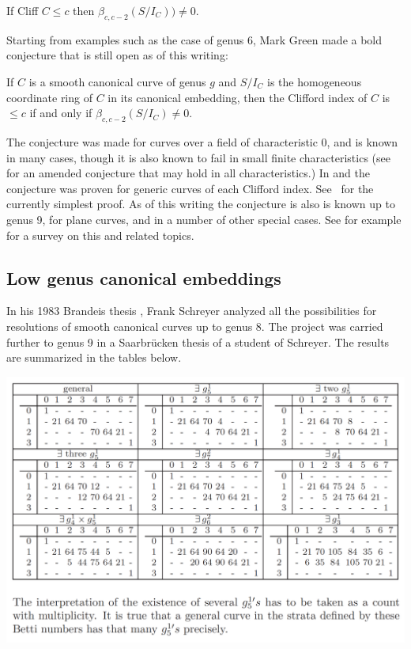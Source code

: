 \begin{corollary}
 If Cliff $C \leq c$ then $\beta_{c,c-2}(S/I_C)) \neq 0.$
\end{corollary}
 

Starting from examples such as the case of genus 6, Mark Green made a bold conjecture that is still open as of this writing:

\begin{conjecture}
If $C$ is a smooth canonical curve of genus $g$ and $S/I_C$ is the homogeneous coordinate ring of $C$ in its canonical embedding,
then the Clifford index of $C$ is $\leq c$ if and only if $\beta_{c,c-2}(S/I_C) \neq 0$. 
\end{conjecture}

The conjecture was made for curves over a field of characteristic 0, and is known in many cases, though it is also known to fail in small finite characteristics (see~\cite{Bopp-Schreyer} for an amended conjecture that may hold in all characteristics.)
In \cite{MR1941089} and \cite{MR2157134} the conjecture was proven for generic curves of each Clifford index.  See~\cite{MR4022070} for the currently simplest
proof. As of this writing the conjecture is also is known up to genus 9,  for plane curves, and in a number of other special cases.
See for example \cite{Farkas-progress-on-syzygies} for a survey on this and related topics.

\subsection{Low genus canonical embeddings} 
In his 1983 Brandeis thesis \cite{Schreyer-canonical}, Frank Schreyer analyzed all the possibilities for resolutions of smooth canonical curves up to genus 8. The project was carried further to genus 9 in a Saarbr\"ucken thesis \cite{Sagraloff}  of a student of Schreyer. The results are summarized in the tables below.


\includegraphics[scale = .35]{"genus 9 Sagraloff"}
%

